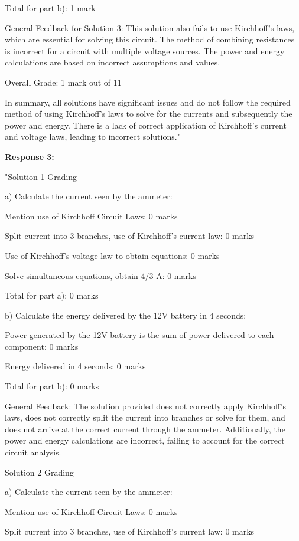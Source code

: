 \documentclass[a4paper,11pt]{article}
\begin{document}
Total for part b): 1 mark

General Feedback for Solution 3:
This solution also fails to use Kirchhoff's laws, which are essential for solving this circuit. The method of combining resistances is incorrect for a circuit with multiple voltage sources. The power and energy calculations are based on incorrect assumptions and values.

Overall Grade: 1 mark out of 11

In summary, all solutions have significant issues and do not follow the required method of using Kirchhoff's laws to solve for the currents and subsequently the power and energy. There is a lack of correct application of Kirchhoff's current and voltage laws, leading to incorrect solutions."

\textbf{Response 3:}

"Solution 1 Grading

a) Calculate the current seen by the ammeter:

Mention use of Kirchhoff Circuit Laws: 0 marks

Split current into 3 branches, use of Kirchhoff’s current law: 0 marks

Use of Kirchhoff’s voltage law to obtain equations: 0 marks

Solve simultaneous equations, obtain 4/3 A: 0 marks

Total for part a): 0 marks

b) Calculate the energy delivered by the 12V battery in 4 seconds:

Power generated by the 12V battery is the sum of power delivered to each component: 0 marks

Energy delivered in 4 seconds: 0 marks

Total for part b): 0 marks

General Feedback:
The solution provided does not correctly apply Kirchhoff's laws, does not correctly split the current into branches or solve for them, and does not arrive at the correct current through the ammeter. Additionally, the power and energy calculations are incorrect, failing to account for the correct circuit analysis.

Solution 2 Grading

a) Calculate the current seen by the ammeter:

Mention use of Kirchhoff Circuit Laws: 0 marks

Split current into 3 branches, use of Kirchhoff’s current law: 0 marks
\end{document}

